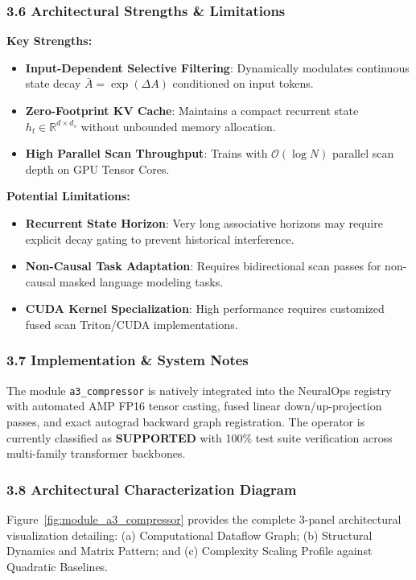 \subsubsection*{3.6 Architectural Strengths \& Limitations}
\textbf{Key Strengths:}
\begin{itemize}
    \item \textbf{Input-Dependent Selective Filtering}: Dynamically modulates continuous state decay $\bar{A} = \exp(\Delta A)$ conditioned on input tokens.
    \item \textbf{Zero-Footprint KV Cache}: Maintains a compact recurrent state $h_t \in \mathbb{R}^{d \times d_s}$ without unbounded memory allocation.
    \item \textbf{High Parallel Scan Throughput}: Trains with $\mathcal{O}(\log N)$ parallel scan depth on GPU Tensor Cores.
\end{itemize}

\textbf{Potential Limitations:}
\begin{itemize}
    \item \textbf{Recurrent State Horizon}: Very long associative horizons may require explicit decay gating to prevent historical interference.
    \item \textbf{Non-Causal Task Adaptation}: Requires bidirectional scan passes for non-causal masked language modeling tasks.
    \item \textbf{CUDA Kernel Specialization}: High performance requires customized fused scan Triton/CUDA implementations.
\end{itemize}

\subsubsection*{3.7 Implementation \& System Notes}
The module \texttt{a3\_compressor} is natively integrated into the NeuralOps registry with automated AMP FP16 tensor casting, fused linear down/up-projection passes, and exact autograd backward graph registration. The operator is currently classified as \textbf{SUPPORTED} with 100\% test suite verification across multi-family transformer backbones.

\subsubsection*{3.8 Architectural Characterization Diagram}
Figure~\ref{fig:module_a3_compressor} provides the complete 3-panel architectural visualization detailing: (a) Computational Dataflow Graph; (b) Structural Dynamics and Matrix Pattern; and (c) Complexity Scaling Profile against Quadratic Baselines.

